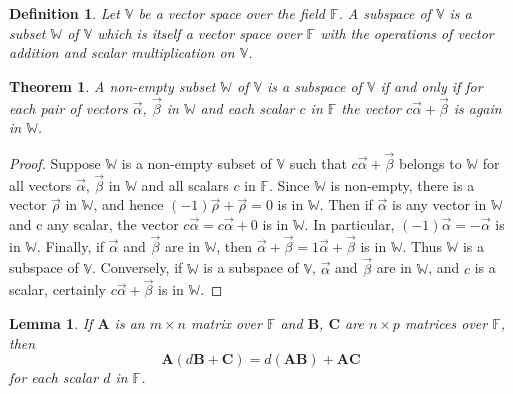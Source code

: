 \documentclass{article}
\newtheorem*{lemma}{Lemma}
\newtheorem*{definition}{Definition}
\newtheorem{theorem}{Theorem}
\begin{document}
    \begin{definition}
        Let \(\mathbb{V}\) be a vector space over the field \(\mathbb{F}\). A subspace of
        \(\mathbb{V}\) is a subset \(\mathbb{W}\) of \(\mathbb{V}\) which is itself a vector
        space over \(\mathbb{F}\) with the operations of vector addition and scalar multiplication
        on \(\mathbb{V}\).
    \end{definition}
    \begin{theorem}
        A non-empty subset \(\mathbb{W}\) of \(\mathbb{V}\) is a subspace of \(\mathbb{V}\)
        if and only if for each pair of vectors \(\vec{\alpha}\), \(\vec{\beta}\) in \(\mathbb{W}\)
        and each scalar \(c\) in \(\mathbb{F}\) the vector \(c \vec{\alpha} + \vec{\beta}\) is
        again in \(\mathbb{W}\).
    \end{theorem}
    \begin{proof}
        Suppose \(\mathbb{W}\) is a non-empty subset of \(\mathbb{V}\) such that 
        \(c \vec{\alpha} + \vec{\beta}\) belongs to \(\mathbb{W}\) for all vectors \(\vec{\alpha}\),
        \(\vec{\beta}\) in \(\mathbb{W}\) and all scalars \(c\) in \(\mathbb{F}\). Since \(\mathbb{W}\)
        is non-empty, there is a vector \(\vec{\rho}\) in \(\mathbb{W}\), and hence 
        \((-1)\vec{\rho} + \vec{\rho}= 0\) is in \(\mathbb{W}\). Then if \(\vec{\alpha}\)
        is any vector in \(\mathbb{W}\) and c any scalar, the vector \(c \vec{\alpha} = c \vec{\alpha} + 0\)
        is in \(\mathbb{W}\). In particular, \((-1) \vec{\alpha} =- \vec{\alpha}\) is in \(\mathbb{W}\).
        Finally, if \(\vec{\alpha}\) and \(\vec{\beta}\) are in \(\mathbb{W}\), then 
        \(\vec{\alpha} + \vec{\beta}=1 \vec{\alpha} + \vec{\beta}\) is in \(\mathbb{W}\).
        Thus \(\mathbb{W}\) is a subspace of \(\mathbb{V}\).
        Conversely, if \(\mathbb{W}\) is a subspace of \(\mathbb{V}\), \(\vec{\alpha}\)
        and \(\vec{\beta}\) are in \(\mathbb{W}\), and \(c\) is a scalar, certainly
        \(c \vec{\alpha} + \vec{\beta}\) is in \(\mathbb{W}\).
    \end{proof}
    \begin{lemma}
        If \(\mathbf{A}\) is an \(m \times n\) matrix over \(\mathbb{F}\) and 
        \(\mathbf{B}\), \(\mathbf{C}\) are \(n \times p\) matrices over \(\mathbb{F}\), then
        \begin{equation}
            \label{}
            \mathbf{A}(d \mathbf{B} + \mathbf{C}) = d(\mathbf{A} \mathbf{B}) + \mathbf{A}\mathbf{C}
        \end{equation}
        for each scalar \(d\) in \(\mathbb{F}\).
    \end{lemma}
\end{document}
